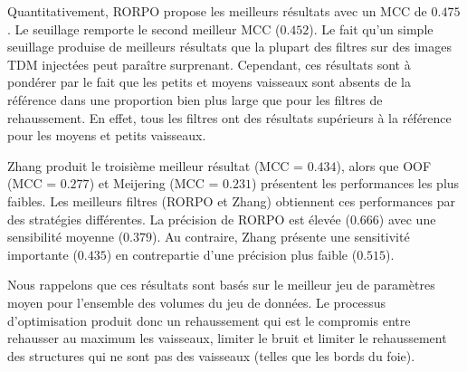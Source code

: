 Quantitativement, RORPO propose les meilleurs résultats avec un MCC de $0.475$. Le seuillage remporte le second meilleur MCC ($0.452$). Le fait qu'un simple seuillage produise de meilleurs résultats que la plupart des filtres sur des images TDM injectées peut paraître surprenant. Cependant, ces résultats sont à pondérer par le fait que les petits et moyens vaisseaux sont absents de la référence dans une proportion bien plus large que pour les filtres de rehaussement. En effet, tous les filtres ont des résultats supérieurs à la référence pour les moyens et petits vaisseaux.  

Zhang produit le troisième meilleur résultat (MCC = $0.434$), alors que OOF (MCC = $0.277$) et Meijering (MCC = $0.231$) présentent les performances les plus faibles. Les meilleurs filtres (RORPO et Zhang) obtiennent ces performances par des stratégies différentes. La précision de RORPO est élevée ($0.666$) avec une sensibilité moyenne ($0.379$). Au contraire, Zhang présente une sensitivité importante ($0.435$) en contrepartie d'une précision plus faible ($0.515$).

Nous rappelons que ces résultats sont basés sur le meilleur jeu de paramètres moyen pour l'ensemble des volumes du jeu de données. Le processus d'optimisation produit donc un rehaussement qui est le compromis entre rehausser au maximum les vaisseaux, limiter le bruit et limiter le rehaussement des structures qui ne sont pas des vaisseaux (telles que les bords du foie). 

